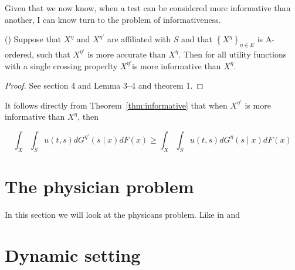 \documentclass[10pt,a4paper]{article} %
\begin{document}
Given that we now know, when a test can be considered more informative than another, I can know turn to the problem of informativeness.

\begin{thm}
\label{thm:informative}
(\citet{Persico2000}) 
Suppose that $X^{\eta}$ and $X^{\eta'}$ are affiliated with $S$ and that $\left\{ X^{\eta}\right\} _{\eta\in E}$ is A-ordered, such that $X^{\eta'}$ is more accurate than $X^{\eta}$. Then for all utility functions with a single crossing properlty $X^{\eta'}$is more informative than $X^{\eta}$.
\end{thm}

\begin{proof}
See \citet{Lehmann1988} section 4 and \citet{Karlin1956} Lemma 3--4 and theorem 1.
\end{proof}

It follows directly from Theorem~\ref{thm:informative} that when $X^{\eta'}$ is more informative than $X^{\eta}$, then

\[
\int_{X}\int_{S}u(t,s)dG^{\eta'}(s\mid x)dF(x)\ge\int_{X}\int_{S}u(t,s)dG^{\eta}(s\mid x)dF(x)
\]


\section{The physician problem}

In this section we will look at the physicans problem. Like in \citet{Allard2009} and \citet{Weiss1996}

\section{Dynamic setting}

\printbibliography
\end{document}
